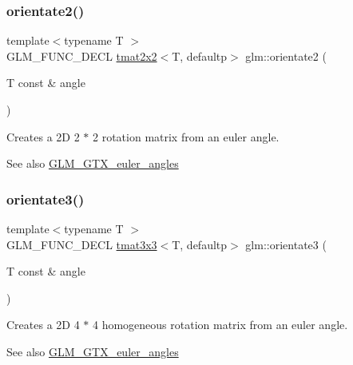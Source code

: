 \subsubsection{\texorpdfstring{orientate2()}{orientate2()}}
{\footnotesize\ttfamily template$<$typename T $>$ \\
G\+L\+M\+\_\+\+F\+U\+N\+C\+\_\+\+D\+E\+CL \hyperlink{structglm_1_1tmat2x2}{tmat2x2}$<$T, defaultp$>$ glm\+::orientate2 (\begin{DoxyParamCaption}\item[{T const \&}]{angle }\end{DoxyParamCaption})}

Creates a 2D 2 $\ast$ 2 rotation matrix from an euler angle. \begin{DoxySeeAlso}{See also}
\hyperlink{group__gtx__euler__angles}{G\+L\+M\+\_\+\+G\+T\+X\+\_\+euler\+\_\+angles} 
\end{DoxySeeAlso}
\mbox{\label{group__gtx__euler__angles_gab188e2526dea3c003e86e298f618085e}} 
\subsubsection{\texorpdfstring{orientate3()}{orientate3()}\hspace{0.1cm}{\footnotesize\ttfamily [1/2]}}
{\footnotesize\ttfamily template$<$typename T $>$ \\
G\+L\+M\+\_\+\+F\+U\+N\+C\+\_\+\+D\+E\+CL \hyperlink{structglm_1_1tmat3x3}{tmat3x3}$<$T, defaultp$>$ glm\+::orientate3 (\begin{DoxyParamCaption}\item[{T const \&}]{angle }\end{DoxyParamCaption})}

Creates a 2D 4 $\ast$ 4 homogeneous rotation matrix from an euler angle. \begin{DoxySeeAlso}{See also}
\hyperlink{group__gtx__euler__angles}{G\+L\+M\+\_\+\+G\+T\+X\+\_\+euler\+\_\+angles} 
\end{DoxySeeAlso}
\mbox{\label{group__gtx__euler__angles_ga33f0d790cecd8337ee83f8e3a8109b11}} 
